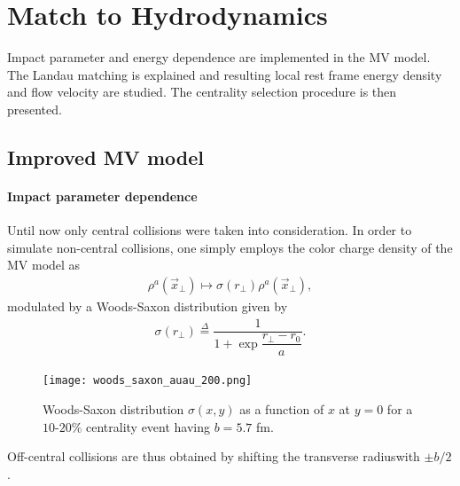 \setchapterpreamble[u]{\margintoc}
\chapter{Match to Hydrodynamics}

\begin{preview}[]
Impact parameter and energy dependence are implemented in the {\sffamily MV} model. The Landau matching is explained and resulting local rest frame energy density and flow velocity are studied. The centrality selection procedure is then presented.
\end{preview}

\section{Improved {\sffamily MV} model}
\subsubsection*{Impact parameter dependence}
Until now only central collisions were taken into consideration. In order to simulate non-central collisions, one simply employs the color charge density of the {\sffamily MV} model as
\begin{align*}
    \rho^a(\vec{x}_\perp)\mapsto \sigma(r_\perp)\rho^a(\vec{x}_\perp),
\end{align*}
modulated by a Woods-Saxon distribution given by
\begin{align*}
    \sigma(r_\perp)\overset{\Delta}{=}\dfrac{1}{1+\exp{\dfrac{r_\perp-r_0}{a}}}.
\end{align*}

\vspace{-0.3cm}

\begin{figure}[!hbt]
	\texttt{[image: woods\_saxon\_auau\_200.png]}
	\caption{\normalsize Woods-Saxon distribution $\sigma(x,y)$ as a function of $x$ at $y=0$ for a $10$-$20\%$ centrality event having $b=5.7$ fm.} 
\end{figure}

Off-central collisions are thus obtained by shifting the transverse radiuswith $\pm b/2$.

